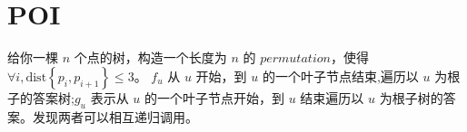 \section{POI}


\prob 给你一棵 $n$ 个点的树，构造一个长度为 $n$ 的 $permutation$，使得 $\forall i, \mathrm{dist}\left\{p_i, p_{i+1}\right\}\le 3$。
\sol $f_u$ 从 $u$ 开始，到 $u$ 的一个叶子节点结束,遍历以 $u$ 为根子的答案树;$g_u$ 表示从 $u$ 的一个叶子节点开始，到 $u$ 结束遍历以 $u$ 为根子树的答案。发现两者可以相互递归调用。